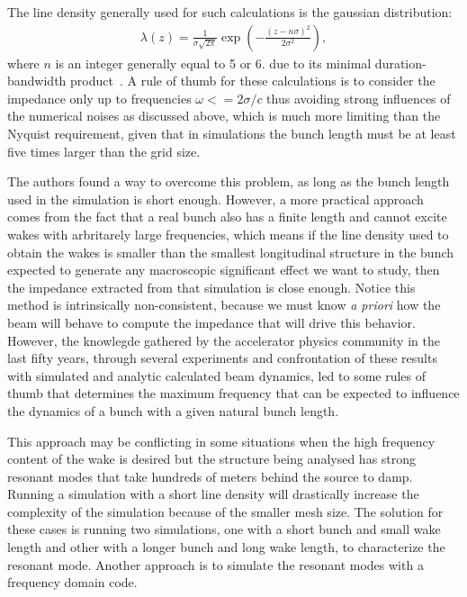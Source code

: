     The line density generally used for such calculations is the gaussian distribution:
    \begin{align}
        \lambda(z) = \frac{1}{\sigma\sqrt{2\pi}}
        \exp\left(-\frac{(z-n\sigma)^2}{2\sigma^2}\right),
    \end{align}
    where $n$ is an integer generally equal to 5 or 6.
    due to its minimal duration-bandwidth product~\cite{Niedermayer2016}. A rule of thumb for these calculations is to consider the impedance only up to frequencies $\omega<=2\sigma/c$ thus avoiding strong influences of the numerical noises as discussed above, which is much more limiting than the Nyquist requirement, given that in simulations the bunch length must be at least five times larger than the grid size.

    The authors  found a way to overcome this problem, as long as the bunch length used in the simulation is short enough. However, a more practical approach comes from the fact that a real bunch also has a finite length and cannot excite wakes with arbritarely large frequencies, which means if the line density used to obtain the wakes is smaller than the smallest longitudinal structure in the bunch expected to generate any macroscopic significant effect we want to study, then the impedance extracted from that simulation is close enough. Notice this method is intrinsically non-consistent, because we must know \emph{a priori} how the beam will behave to compute the impedance that will drive this behavior. However, the knowlegde gathered by the accelerator physics community in the last fifty years, through several experiments and confrontation of these results with simulated and analytic calculated beam dynamics, led to some rules of thumb that determines the maximum frequency that can be expected to influence the dynamics of a bunch with a given natural bunch length.

    This approach may be conflicting in some situations when the high frequency content of the wake is desired but the structure being analysed has strong resonant modes that take hundreds of meters behind the source to damp. Running a simulation with a short line density will drastically increase the complexity of the simulation because of the smaller mesh size. The solution for these cases is running two simulations, one with a short bunch and small wake length and other with a longer bunch and long wake length, to characterize the resonant mode. Another approach is to simulate the resonant modes with a frequency domain code.

